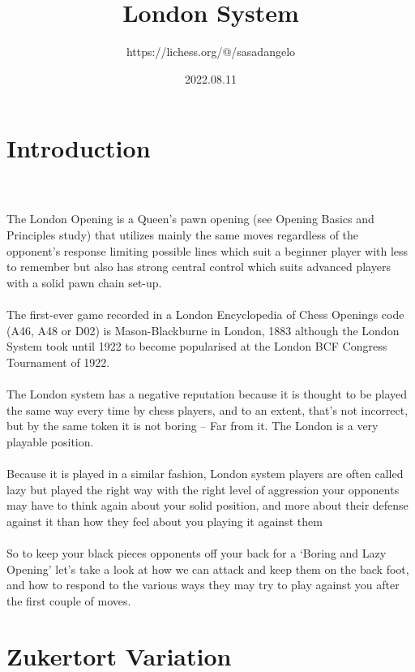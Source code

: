 \documentclass{article}
\title{London System}
\author{https://lichess.org/@/sasadangelo}
\date{2022.08.11}
\begin{document}
\begin{titlepage}
\maketitle
\end{titlepage}
\section{ Introduction}

\\
\\
The London Opening is a Queen’s pawn opening (see Opening Basics and Principles study) that utilizes mainly the same moves regardless of the opponent’s response limiting possible lines which suit a beginner player with less to remember but also has strong central control which suits advanced players with a solid pawn chain set-up.\\\\The first-ever game recorded in a London Encyclopedia of Chess Openings code (A46, A48 or D02) is Mason-Blackburne in London, 1883 although the London System took until 1922 to become popularised at the London BCF Congress Tournament of 1922.\\\\The London system has a negative reputation because it is thought to be played the same way every time by chess players, and to an extent, that’s not incorrect, but by the same token it is not boring – Far from it. The London is a very playable position.\\\\Because it is played in a similar fashion, London system players are often called lazy but played the right way with the right level of aggression your opponents may have to think again about your solid position, and more about their defense against it than how they feel about you playing it against them\\\\So to keep your black pieces opponents off your back for a ‘Boring and Lazy Opening’ let’s take a look at how we can attack and keep them on the back foot, and how to respond to the various ways they may try to play against you after the first couple of moves.\section{ Zukertort Variation}

\\
\end{document}
